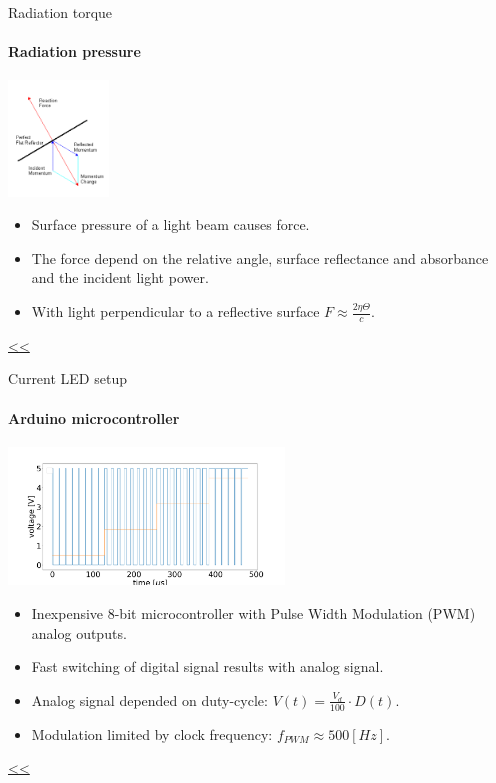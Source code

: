 \documentclass{beamer}
\begin{document}
\begin{frame}{\hypertarget{frame:Radiation torque 1}{Radiation torque}}
\framesubtitle{Radiation pressure}
	\begin{center}		
		\includegraphics[width=0.2\textwidth,keepaspectratio]{radiation.PNG}
    \end{center}

	
	\begin{itemize}		
		\item Surface pressure of a light beam causes force.
		\item The force depend on the relative angle, surface reflectance and absorbance and the incident light power.
		\item With light perpendicular to a reflective surface $F  \approx\frac{2\eta\Theta}{{c}} $.
		
	\end{itemize}
	\hyperlink{frame:Radiation torque}{<<} 
\end{frame}



\begin{frame}{\hypertarget{frame:Current LED setup 1}{Current LED setup}}
	\framesubtitle{Arduino microcontroller}
	\begin{center}		
		\includegraphics[width=0.55\textwidth,keepaspectratio]{duty_cycle.png}
	\end{center}
	\begin{itemize}		
		\item Inexpensive 8-bit microcontroller with Pulse Width Modulation (PWM) analog outputs.
		\item Fast switching of digital signal results with analog signal.
		\item Analog signal depended on duty-cycle: $V(t) =  \frac{V_d}{100}\cdot D(t)$.
		\item Modulation limited by clock frequency: $f_{PWM} \approx 500[Hz]$.
	\end{itemize}
	\hyperlink{frame:Current LED setup}{<<} 
\end{frame}
\end{document}
